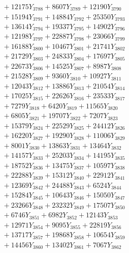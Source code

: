 \documentclass[a4paper,10pt]{article}
\begin{document}
{\begin{align}
&\;  + 12175 Y_{3788} + 8607 Y_{3789} + 12190 Y_{3790} \\[0.3ex]
&\;  + 15194 Y_{3791} + 14884 Y_{3792} + 25350 Y_{3793} \\[0.3ex]
&\;  + 13614 Y_{3794} + 19337 Y_{3795} + 14902 Y_{3796} \\[0.3ex]
&\;  + 12198 Y_{3797} + 22887 Y_{3798} + 23066 Y_{3799} \\[0.3ex]
&\;  + 16188 Y_{3800} + 10467 Y_{3801} + 21741 Y_{3802} \\[0.3ex]
&\;  + 21729 Y_{3803} + 24833 Y_{3804} + 17697 Y_{3805} \\[0.3ex]
&\;  + 22673 Y_{3806} + 14525 Y_{3807} + 8987 Y_{3808} \\[0.5ex]\allowbreak
&\;  + 21528 Y_{3809} + 9360 Y_{3810} + 10927 Y_{3811} \\[0.3ex]
&\;  + 12043 Y_{3812} + 13886 Y_{3813} + 21054 Y_{3814} \\[0.3ex]
&\;  + 17025 Y_{3815} + 22626 Y_{3816} + 23533 Y_{3817} \\[0.3ex]
&\;  + 7279 Y_{3818} + 6420 Y_{3819} + 11565 Y_{3820} \\[0.3ex]
&\;  + 6805 Y_{3821} + 19707 Y_{3822} + 7207 Y_{3823} \\[0.3ex]
&\;  + 15379 Y_{3824} + 22529 Y_{3825} + 24412 Y_{3826} \\[0.3ex]
&\;  + 16220 Y_{3827} + 19290 Y_{3828} + 11006 Y_{3829} \\[0.3ex]
&\;  + 8001 Y_{3830} + 13863 Y_{3831} + 13464 Y_{3832} \\[0.3ex]
&\;  + 14157 Y_{3833} + 25203 Y_{3834} + 14195 Y_{3835} \\[0.3ex]
&\;  + 18752 Y_{3836} + 13475 Y_{3837} + 10597 Y_{3838} \\[0.5ex]\allowbreak
&\;  + 22288 Y_{3839} + 15312 Y_{3840} + 22912 Y_{3841} \\[0.3ex]
&\;  + 12369 Y_{3842} + 24488 Y_{3843} + 6524 Y_{3844} \\[0.3ex]
&\;  + 15284 Y_{3845} + 10643 Y_{3846} + 15050 Y_{3847} \\[0.3ex]
&\;  + 23266 Y_{3848} + 23232 Y_{3849} + 17507 Y_{3850} \\[0.3ex]
&\;  + 6746 Y_{3851} + 6982 Y_{3852} + 12143 Y_{3853} \\[0.3ex]
&\;  + 12971 Y_{3854} + 9095 Y_{3855} + 22819 Y_{3856} \\[0.3ex]
&\;  + 13717 Y_{3857} + 19868 Y_{3858} + 10654 Y_{3859} \\[0.3ex]
&\;  + 14456 Y_{3860} + 13402 Y_{3861} + 7067 Y_{3862} \\[0.3ex]

\end{align}}
\end{document}
